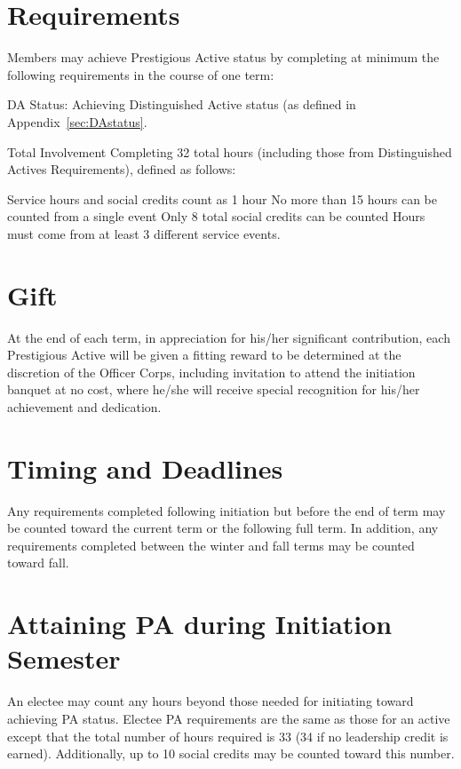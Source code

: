 \section{Requirements} Members may achieve Prestigious Active status by completing at minimum the following requirements in the course of one term:
\begin{enumsubsection}
\item{DA Status:} Achieving Distinguished Active status (as defined in Appendix~\ref{sec:DAstatus}.
\item{Total Involvement} Completing 32 total hours (including those from Distinguished Actives Requirements), defined as follows:
\begin{compactenum}[1.]
\itemnotoc Service hours and social credits count as 1 hour
\itemnotoc No more than 15 hours can be counted from a single event
\itemnotoc Only 8 total social credits can be counted
\itemnotoc Hours must come from at least 3 different service events.
\end{compactenum}
\end{enumsubsection}
\section{Gift} At the end of each term, in appreciation for his/her significant contribution, each Prestigious Active will be given a fitting reward to be determined at the discretion of the Officer Corps, including invitation to attend the initiation banquet at no cost, where he/she will receive special recognition for his/her achievement and dedication.
\section{Timing and Deadlines} Any requirements completed following initiation but before the end of term may be counted toward the current term or the following full term. In addition, any requirements completed between the winter and fall terms may be counted toward fall. 

\section{Attaining PA during Initiation Semester} An electee may count any hours beyond those needed for initiating toward achieving PA status. Electee PA requirements are the same as those for an active except that the total number of hours required is 33 (34 if no leadership credit is earned). Additionally, up to 10 social credits may be counted toward this number.
